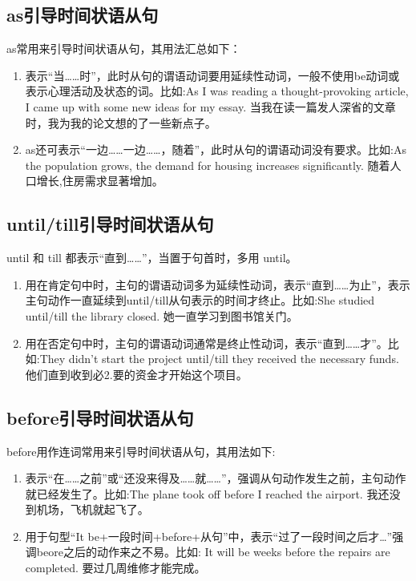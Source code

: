 \subsection{as引导时间状语从句}

as常用来引导时间状语从句，其用法汇总如下：
\begin{enumerate}
  \item 表示“当……时”，此时从句的谓语动词要用延续性动词，一般不使用be动词或表示心理活动及状态的词。比如:As I was reading a thought-provoking article, I came up with some new ideas for my essay. 当我在读一篇发人深省的文章时，我为我的论文想的了一些新点子。
  \item as还可表示“一边……一边……，随着”，此时从句的谓语动词没有要求。比如:As the population grows, the demand for housing increases significantly. 随着人口增长,住房需求显著增加。
\end{enumerate}

\subsection{until/till引导时间状语从句}

until 和 till 都表示“直到……”，当置于句首时，多用 until。
\begin{enumerate}
  \item 用在肯定句中时，主句的谓语动词多为延续性动词，表示“直到……为止”，表示主句动作一直延续到until/till从句表示的时间才终止。比如:She studied until/till the library closed. 她一直学习到图书馆关门。
  \item 用在否定句中时，主句的谓语动词通常是终止性动词，表示“直到……才”。比如:They didn't start the project until/till they received the necessary funds. 他们直到收到必2.要的资金才开始这个项目。
\end{enumerate}

\subsection{before引导时间状语从句}

before用作连词常用来引导时间状语从句，其用法如下:
\begin{enumerate}
  \item 表示“在……之前”或“还没来得及……就……”，强调从句动作发生之前，主句动作就已经发生了。比如:The plane took off before I reached the airport. 我还没到机场，飞机就起飞了。
  \item 用于句型“It be+一段时间+before+从句”中，表示“过了一段时间之后才…”强调beore之后的动作来之不易。比如: It will be weeks before the repairs are completed. 要过几周维修才能完成。
\end{enumerate}

